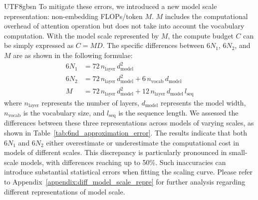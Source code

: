 \documentclass[11pt, a4paper, logo, copyright, nonumbering]{deepseek}
\begin{document}
\begin{CJK*}{UTF8}{gbsn}
To mitigate these errors, we introduced a new model scale representation: non-embedding FLOPs/token $M$. $M$ includes the computational overhead of attention operation but does not take into account the vocabulary computation. With the model scale represented by $M$, the compute budget $C$ can be simply expressed as $C=MD$. The specific differences between $6N_1$, $6N_2$, and $M$ are as shown in the following formulae:
\begin{equation}
\label{eqa:diff_model_scale}
\begin{aligned}
    6N_1 &= 72\,n_{\mathrm{layer}}\,d_{\mathrm{model}}^2 \\
    6N_2 &= 72\,n_{\mathrm{layer}}\,d_{\mathrm{model}}^2 + 6\,n_{\mathrm{vocab}}\,d_{\mathrm{model}} \\
    M &= 72\,n_{\mathrm{layer}}\,d_{\mathrm{model}}^2 + 12\,n_{\mathrm{layer}}\,d_{\mathrm{model}}\,l_{\mathrm{seq}}
\end{aligned}
\end{equation}
where $n_{\mathrm{layer}}$ represents the number of layers, $d_{\mathrm{model}}$ represents the model width, $n_{\mathrm{vocab}}$ is the vocabulary size, and $l_{\mathrm{seq}}$ is the sequence length. We assessed the differences between these three representations across models of varying scales, as shown in Table~\ref{tab:6nd_approximation_error}. The results indicate that both $6N_1$ and $6N_2$ either overestimate or underestimate the computational cost in models of different scales. This discrepancy is particularly pronounced in small-scale models, with differences reaching up to 50\%. Such inaccuracies can introduce substantial statistical errors when fitting the scaling curve. Please refer to Appendix~\ref{appendix:diff_model_scale_repre} for further analysis regarding different representations of model scale.



\end{CJK*}
\end{document}

